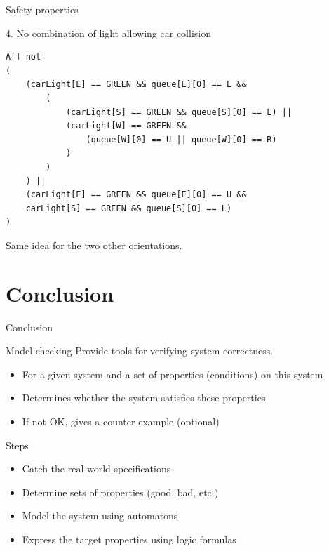 \documentclass{bredelebeamer}
\begin{document}
\begin{frame}[fragile]{Safety properties}
\begin{block}{4. No combination of light allowing car collision}
\begin{verbatim}
A[] not 
(
    (carLight[E] == GREEN && queue[E][0] == L &&
        (
            (carLight[S] == GREEN && queue[S][0] == L) ||
            (carLight[W] == GREEN &&
                (queue[W][0] == U || queue[W][0] == R)
            )
        )
    ) || 
    (carLight[E] == GREEN && queue[E][0] == U &&
    carLight[S] == GREEN && queue[S][0] == L)
)
\end{verbatim}

Same idea for the two other orientations.
\end{block}
\end{frame}


\section{Conclusion}
\begin{frame}{Conclusion}

\begin{block}{Model checking}
Provide tools for verifying system correctness.
\begin{itemize}
\item For a given system and a set of properties (conditions) on this system
\item Determines whether the system satisfies these properties.
\item If not OK, gives a counter-example (optional)
\end{itemize}
\end{block}

\begin{block}{Steps}
\begin{itemize}
\item Catch the real world specifications
\item Determine sets of properties (good, bad, etc.)
\item Model the system using automatons
\item Express the target properties using logic formulas  

\end{itemize}

\end{block}

\end{frame}
\end{document}
